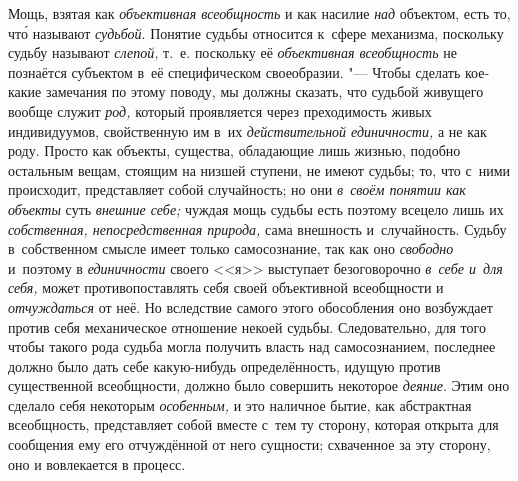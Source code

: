 Мощь, взятая как
{\em объективная всеобщность}
и как насилие {\em над}
объектом, есть то, чт\'{о} называют
{\em судьбой}. Понятие
судьбы относится к~сфере механизма, поскольку судьбу называют
{\em слепой,} т.~е.
поскольку её {\em объективная
всеобщность} не познаётся субъектом в~её специфическом
своеобразии. "--- Чтобы сделать кое-какие замечания
по этому поводу, мы должны сказать, что судьбой живущего вообще служит
{\em род,} который
проявляется через преходимость живых индивидуумов, свойственную им в~их
{\em действительной единичности,}
а не как роду. Просто как объекты, существа, обладающие лишь
жизнью, подобно остальным вещам, стоящим на низшей ступени, не имеют
судьбы; то, что с~ними происходит, представляет собой случайность; но они
{\em в~своём понятии как объекты}
суть {\em внешние себе;}
чуждая мощь судьбы есть поэтому всецело лишь их
{\em собственная, непосредственная
природа,} сама внешность и~случайность. Судьбу в~собственном
смысле имеет только самосознание, так как оно
{\em свободно} и~поэтому
в {\em единичности}
своего <<я>> выступает безоговорочно
{\em в~себе и~для себя,}
может противопоставлять себя своей объективной всеобщности и
{\em отчуждаться} от неё.
Но вследствие самого этого обособления оно возбуждает против
себя механическое отношение некоей судьбы. Следовательно, для того чтобы
такого рода судьба могла получить власть над самосознанием, последнее
должно было дать себе какую-нибудь определённость, идущую против
существенной всеобщности, должно было совершить некоторое
{\em деяние}. Этим оно
сделало себя некоторым {\em особенным,}
и это наличное бытие, как абстрактная всеобщность,
представляет собой вместе с~тем ту сторону, которая открыта для сообщения
ему его отчуждённой от него сущности; схваченное за эту сторону, оно и
вовлекается в
процесс.
